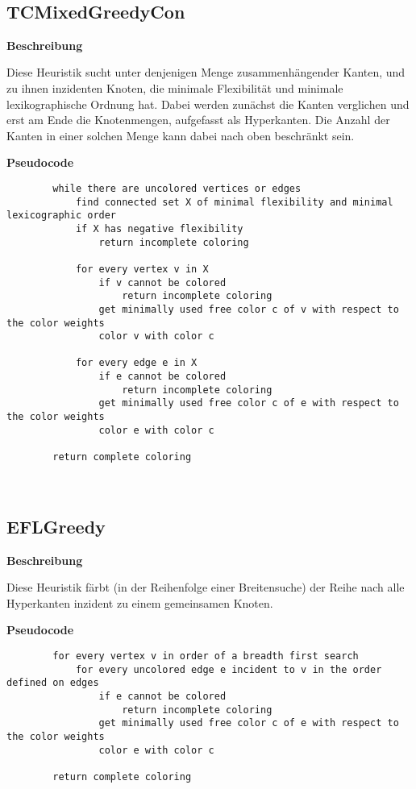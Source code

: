 \documentclass{article}
\begin{document}
	~\newpage
	\subsection{TCMixedGreedyCon}
	
	\textbf{Beschreibung}
	
	Diese Heuristik sucht unter denjenigen Menge zusammenhängender Kanten, und zu ihnen inzidenten Knoten, die minimale Flexibilität und minimale lexikographische Ordnung hat. Dabei werden zunächst die Kanten verglichen und erst am Ende die Knotenmengen, aufgefasst als Hyperkanten. Die Anzahl der Kanten in einer solchen Menge kann dabei nach oben beschränkt sein.
	
	\textbf{Pseudocode}
	\begin{verbatim}
		while there are uncolored vertices or edges
		    find connected set X of minimal flexibility and minimal lexicographic order
		    if X has negative flexibility
		        return incomplete coloring
		    
		    for every vertex v in X
		        if v cannot be colored
		            return incomplete coloring
		        get minimally used free color c of v with respect to the color weights
		        color v with color c
		        
		    for every edge e in X
		        if e cannot be colored
		            return incomplete coloring
		        get minimally used free color c of e with respect to the color weights
		        color e with color c
		       
		return complete coloring
	\end{verbatim}
	
	~\newpage
	\subsection{EFLGreedy}
	
	\textbf{Beschreibung}
	
	Diese Heuristik färbt (in der Reihenfolge einer Breitensuche) der Reihe nach alle Hyperkanten inzident zu einem gemeinsamen Knoten.
	
	\textbf{Pseudocode}
	\begin{verbatim}    
		for every vertex v in order of a breadth first search
		    for every uncolored edge e incident to v in the order defined on edges
		        if e cannot be colored
		            return incomplete coloring
		        get minimally used free color c of e with respect to the color weights
		        color e with color c
				        
		return complete coloring
	\end{verbatim}
	
\end{document}
